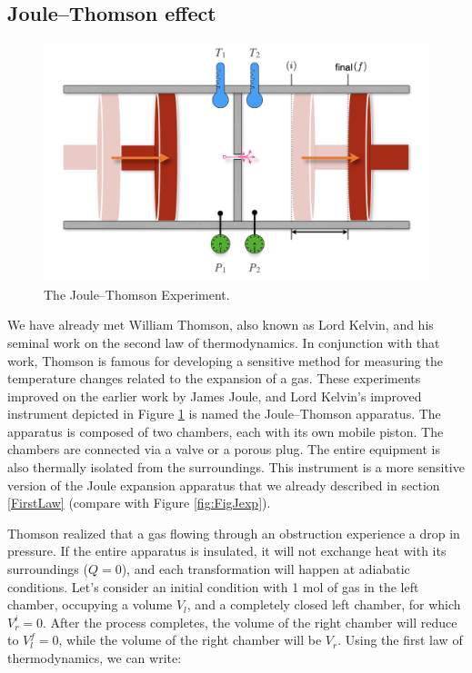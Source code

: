 \documentclass[
  9pt,
]{extbook}
\theoremstyle{definition}
\theoremstyle{definition}
\theoremstyle{definition}
\theoremstyle{remark}
\begin{document}
\normalsize

\hypertarget{joulethomson-effect}{%
\subsection{Joule--Thomson effect}\label{joulethomson-effect}}

\begin{figure}

{\centering \includegraphics[width=0.8\linewidth]{./img/OEP_Figures.015} 

}

\caption{The Joule–Thomson Experiment.}\label{fig:FigJT}
\end{figure}

We have already met William Thomson, also known as Lord Kelvin, and his seminal work on the second law of thermodynamics. In conjunction with that work, Thomson is famous for developing a sensitive method for measuring the temperature changes related to the expansion of a gas. These experiments improved on the earlier work by James Joule, and Lord Kelvin's improved instrument depicted in Figure \ref{fig:FigJT} is named the Joule--Thomson apparatus. The apparatus is composed of two chambers, each with its own mobile piston. The chambers are connected via a valve or a porous plug. The entire equipment is also thermally isolated from the surroundings. This instrument is a more sensitive version of the Joule expansion apparatus that we already described in section \ref{FirstLaw} (compare with Figure \ref{fig:FigJexp}).

Thomson realized that a gas flowing through an obstruction experience a drop in pressure. If the entire apparatus is insulated, it will not exchange heat with its surroundings (\(Q=0\)), and each transformation will happen at adiabatic conditions. Let's consider an initial condition with 1 mol of gas in the left chamber, occupying a volume \(V_l\), and a completely closed left chamber, for which \(V_r^i=0\). After the process completes, the volume of the right chamber will reduce to \(V_l^f=0\), while the volume of the right chamber will be \(V_r\). Using the first law of thermodynamics, we can write:
\end{document}
